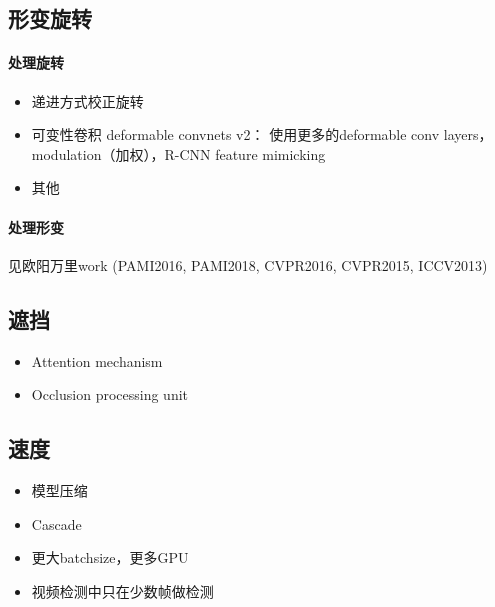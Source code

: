 \documentclass[UTF8, a4paper]{ctexart}
\begin{document}
\subsection{形变旋转}

\paragraph{处理旋转}
\begin{itemize}
    \item 递进方式校正旋转\cite{Rotation_Invariant_PCN_Shi_2018_CVPR}
    \item 可变性卷积 deformable convnets v2\cite{deformable_convnet_Dai_2017_ICCV,deformable_convnetv2_Zhu_2019_CVPR}：
    使用更多的deformable conv layers， modulation（加权），R-CNN feature mimicking
    \item 其他
\end{itemize}

\paragraph{处理形变} 见欧阳万里work (PAMI2016, PAMI2018, CVPR2016, CVPR2015, ICCV2013)

\subsection{遮挡}

\begin{itemize}
    \item Attention mechanism\cite{occluded_pedestrian_Zhang_2018_CVPR,feature_selective_net_Zhai_2018_CVPR}
    \item Occlusion processing unit\cite{occlusion_aware_rcnn_Zhang_2018_ECCV}
\end{itemize}

\subsection{速度}

\begin{itemize}
    \item 模型压缩\cite{mimi_efficient_net_Li_2017_CVPR,Quantization_mimic_Wei_2018_ECCV}
    \item Cascade\cite{cascade_net_Ouyang_2017_ICCV,beyond_tradeoff_Song_2018_CVPR}
    \item 更大batchsize，更多GPU\cite{MegDet_Peng_2018_CVPR}
    \item 视频检测中只在少数帧做检测\cite{high_perform_video_det_Zhu_2018_CVPR,deep_feature_flow_Zhu_2017_CVPR,flow_guide_feature_aggre_Zhu_2017_ICCV}
\end{itemize}
\end{document}
